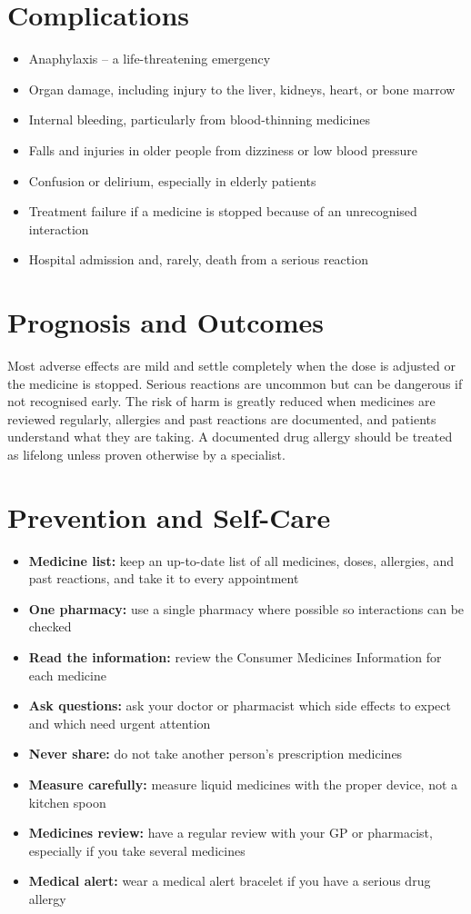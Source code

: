 \section*{Complications}
\begin{itemize}
    \item Anaphylaxis -- a life-threatening emergency
    \item Organ damage, including injury to the liver, kidneys, heart, or bone marrow
    \item Internal bleeding, particularly from blood-thinning medicines
    \item Falls and injuries in older people from dizziness or low blood pressure
    \item Confusion or delirium, especially in elderly patients
    \item Treatment failure if a medicine is stopped because of an unrecognised interaction
    \item Hospital admission and, rarely, death from a serious reaction
\end{itemize}

\section*{Prognosis and Outcomes}
Most adverse effects are mild and settle completely when the dose is adjusted or the medicine is stopped. Serious reactions are uncommon but can be dangerous if not recognised early. The risk of harm is greatly reduced when medicines are reviewed regularly, allergies and past reactions are documented, and patients understand what they are taking. A documented drug allergy should be treated as lifelong unless proven otherwise by a specialist.

\section*{Prevention and Self-Care}
\begin{itemize}
    \item \textbf{Medicine list:} keep an up-to-date list of all medicines, doses, allergies, and past reactions, and take it to every appointment
    \item \textbf{One pharmacy:} use a single pharmacy where possible so interactions can be checked
    \item \textbf{Read the information:} review the Consumer Medicines Information for each medicine
    \item \textbf{Ask questions:} ask your doctor or pharmacist which side effects to expect and which need urgent attention
    \item \textbf{Never share:} do not take another person's prescription medicines
    \item \textbf{Measure carefully:} measure liquid medicines with the proper device, not a kitchen spoon
    \item \textbf{Medicines review:} have a regular review with your GP or pharmacist, especially if you take several medicines
    \item \textbf{Medical alert:} wear a medical alert bracelet if you have a serious drug allergy
\end{itemize}

